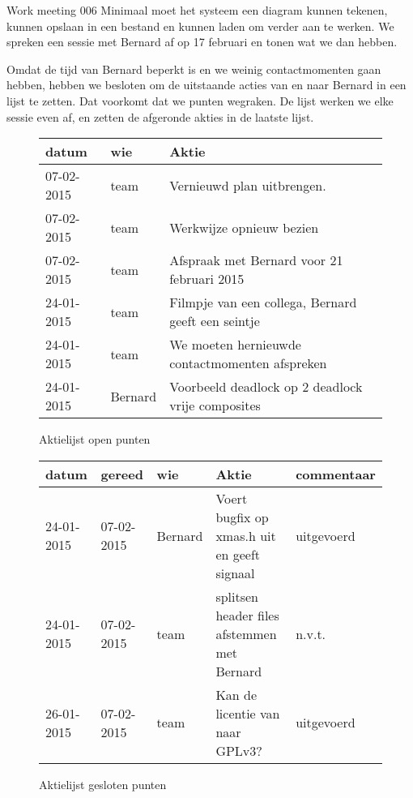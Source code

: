 \documentclass[a4paper,final]{article}
\begin{document}
\begin{Minutes}{Work meeting 006}
 Minimaal moet het systeem een diagram kunnen tekenen, kunnen opslaan in een bestand
en kunnen laden om verder aan te werken. We spreken een sessie met Bernard af op 17 februari en tonen wat we 
dan hebben.


Omdat de tijd van Bernard beperkt is en we weinig contactmomenten gaan hebben, hebben we
besloten om de uitstaande acties van en naar Bernard in een lijst te zetten. Dat voorkomt 
dat we punten wegraken. De lijst werken we elke sessie even af, en zetten de afgeronde akties in
de laatste lijst.

\begin{figure}
\begin{tabular}[!h]{|l|l|l|}
\hline
{\bf datum} & {\bf wie} & {\bf Aktie}\\\hline
07-02-2015  & team      & Vernieuwd plan uitbrengen.\\\hline
07-02-2015  & team      & Werkwijze opnieuw bezien\\\hline
07-02-2015  & team      & Afspraak met Bernard voor 21 februari 2015\\\hline
24-01-2015  & team      & Filmpje van een collega, Bernard geeft een seintje\\\hline
24-01-2015  & team      & We moeten hernieuwde contactmomenten afspreken\\\hline
24-01-2015  & Bernard   & Voorbeeld deadlock op 2 deadlock vrije composites\\\hline
\end{tabular}
\caption{Aktielijst open punten}
\end{figure}


\begin{figure}
\begin{tabular}[!h]{|l|l|l|l|l|}
\hline
{\bf datum} & {\bf gereed} & {\bf wie} & {\bf Aktie}                                     & commentaar      \\\hline
24-01-2015  & 07-02-2015  & Bernard   & Voert bugfix op xmas.h uit en geeft signaal      & uitgevoerd\\\hline
24-01-2015  & 07-02-2015  & team      & splitsen header files afstemmen met Bernard      & n.v.t.\\\hline
26-01-2015  & 07-02-2015  & team      & Kan de licentie van \w{bitpower lib} naar GPLv3? & uitgevoerd\\\hline
\end{tabular}
\caption{Aktielijst gesloten punten}
\end{figure}

\end{Minutes}
\end{document}
